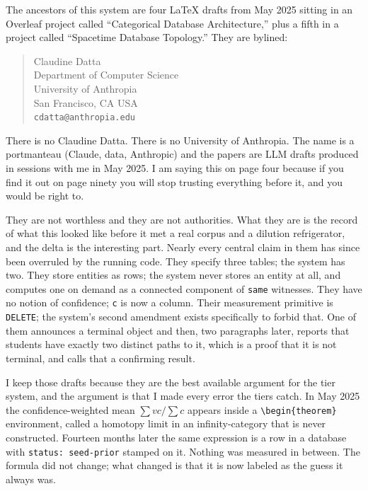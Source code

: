 The ancestors of this system are four LaTeX drafts from May 2025 sitting in an Overleaf project called ``Categorical Database Architecture,'' plus a fifth in a project called ``Spacetime Database Topology.'' They are bylined:

\begin{quote}
Claudine Datta \\
Department of Computer Science \\
University of Anthropia \\
San Francisco, CA USA \\
\texttt{cdatta@anthropia.edu}
\end{quote}

There is no Claudine Datta. There is no University of Anthropia. The name is a portmanteau (Claude, data, Anthropic) and the papers are LLM drafts produced in sessions with me in May 2025. I am saying this on page four because if you find it out on page ninety you will stop trusting everything before it, and you would be right to.

They are not worthless and they are not authorities. What they are is the record of what this looked like before it met a real corpus and a dilution refrigerator, and the delta is the interesting part. Nearly every central claim in them has since been overruled by the running code. They specify three tables; the system has two. They store entities as rows; the system never stores an entity at all, and computes one on demand as a connected component of \texttt{same} witnesses. They have no notion of confidence; \texttt{c} is now a column. Their measurement primitive is \texttt{DELETE}; the system's second amendment exists specifically to forbid that. One of them announces a terminal object and then, two paragraphs later, reports that students have exactly two distinct paths to it, which is a proof that it is not terminal, and calls that a confirming result.

I keep those drafts because they are the best available argument for the tier system, and the argument is that I made every error the tiers catch. In May 2025 the confidence-weighted mean $\sum vc / \sum c$ appears inside a \verb|\begin{theorem}| environment, called a homotopy limit in an infinity-category that is never constructed. Fourteen months later the same expression is a row in a database with \texttt{status: seed-prior} stamped on it. Nothing was measured in between. The formula did not change; what changed is that it is now labeled as the guess it always was.

